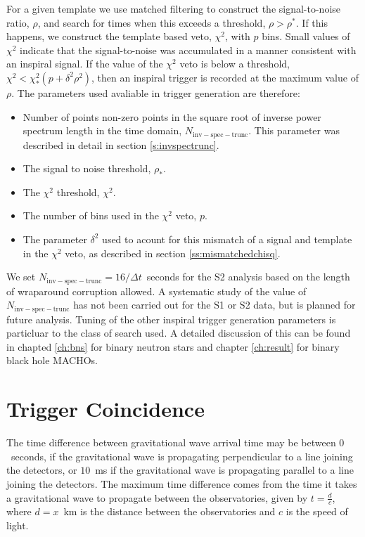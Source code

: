 For a given template we use matched filtering to construct the signal-to-noise
ratio, $\rho$, and search for times when this exceeds a threshold, $\rho >
\rho^\ast$. If this happens, we construct the template based veto, $\chi^2$,
with $p$ bins. Small values of $\chi^2$ indicate that the signal-to-noise was
accumulated in a manner consistent with an inspiral signal. If the value of
the $\chi^2$ veto is below a threshold, $\chi^2 < \chi^2_\ast (p + \delta^2
\rho^2)$, then an inspiral trigger is recorded at the maximum value of $\rho$.
The parameters used avaliable in trigger generation are therefore:
\begin{itemize}
\item Number of points non-zero points in the square root of inverse power
spectrum length in the time domain, $N_\mathrm{inv-spec-trunc}$. This
parameter was described in detail in section \ref{s:invspectrunc}.

\item The signal to noise threshold, $\rho_\ast$.

\item The $\chi^2$ threshold, $\chi^2$.

\item The number of bins used in the $\chi^2$ veto, $p$.

\item The parameter $\delta^2$ used to acount for this mismatch of a signal
and template in the $\chi^2$ veto, as described in section
\ref{ss:mismatchedchisq}.
\end{itemize}
We set $N_\mathrm{inv-spec-trunc} = 16 / \Delta t$~seconds for the S2 analysis
based on the length of wraparound corruption allowed. A systematic study of
the value of $N_\mathrm{inv-spec-trunc}$ has not been carried out for the S1
or S2 data, but is planned for future analysis. Tuning of the other inspiral
trigger generation parameters is particluar to the class of search used. A
detailed discussion of this can be found in chapted \ref{ch:bns} for binary
neutron stars and chapter \ref{ch:result} for binary black hole MACHOs.

\section{Trigger Coincidence}
\label{s:coincidence}

The time difference between gravitational wave arrival time
may be between $0$~seconds, if the gravitational wave is propagating
perpendicular to a line joining the detectors, or $10$~ms if the gravitational
wave is propagating parallel to a line joining the detectors. The maximum
time difference comes from the time it takes a gravitational wave to propagate
between the observatories, given by $t = \frac{d}{c}$, where $d = x$~km is the
distance between the observatories and $c$ is the speed of light.


